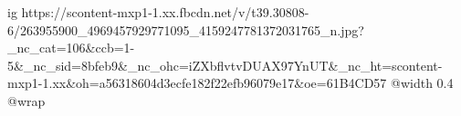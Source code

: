  
 
 
 
 

\ifcmt
  ig https://scontent-mxp1-1.xx.fbcdn.net/v/t39.30808-6/263955900_4969457929771095_4159247781372031765_n.jpg?_nc_cat=106&ccb=1-5&_nc_sid=8bfeb9&_nc_ohc=iZXbflvtvDUAX97YnUT&_nc_ht=scontent-mxp1-1.xx&oh=a56318604d3ecfe182f22efb96079e17&oe=61B4CD57
  @width 0.4
  @wrap 
\fi
